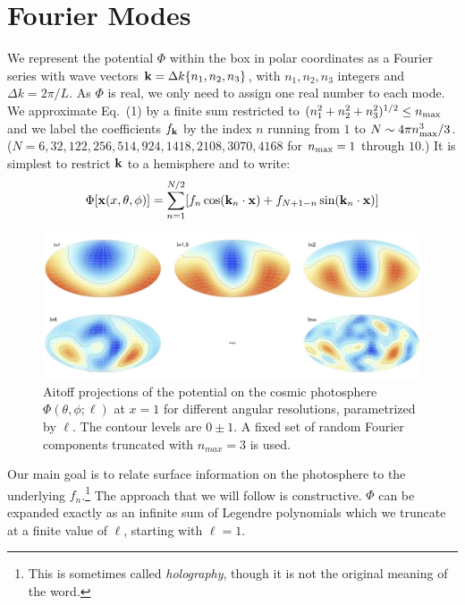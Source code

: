 \documentclass[12pt]{article}
\begin{document}
\section{Fourier Modes}
We represent the potential $\Phi$ within the box in polar coordinates as a Fourier series with wave vectors ${\bf k}=\Delta k\{n_1,n_2,n_3\}$, with $n_1,n_2,n_3$ integers and $\Delta k=2\pi/L$. As $\Phi$ is real, we only need to assign one real number to each mode. We approximate Eq.~(1) by a finite sum restricted to $(n_1^2+n_2^2+n_3^2)^{1/2}\le n_{\rm max}$ and we label the coefficients $f_{\bf k}$ by the index $n$ running from $1$ to $N\sim4\pi n_{\rm max}^3/3$. ($N=6,32,122, 256,514,924,1418,2108,3070,4168$ for $n_{\rm max}=1$ through $10$.) It is simplest to restrict ${\bf k}$ to a hemisphere and to write:
\begin{equation}
\Phi[{\bf x}(x,\theta,\phi)]=\sum_{n=1}^{N/2}[f_n\cos({\bf k}_n\cdot{\bf x})+f_{N+1-n}\sin({\bf k}_n\cdot{\bf x})]
\end{equation}
\begin{figure}[h!]
\centering
\includegraphics[width=6in]{fig1.jpg}
\caption{Aitoff projections of the potential on the cosmic photosphere $\Phi(\theta,\phi;\ell)$ at $x=1$ for different angular resolutions, parametrized by $\ell$. The contour levels are $0\pm1$. A fixed set of random Fourier components truncated with $n_{max}=3$ is used.}
\end{figure}

Our main goal is to relate surface information on the photosphere to
the underlying $f_n$.\footnote{This is sometimes called
\emph{holography}, though it is not the original meaning of the word.}
The approach that we will follow is constructive. $\Phi$ can be
expanded exactly as an infinite sum of Legendre polynomials which we
truncate at a finite value of $\ell$, starting with $\ell=1$.
\end{document}
